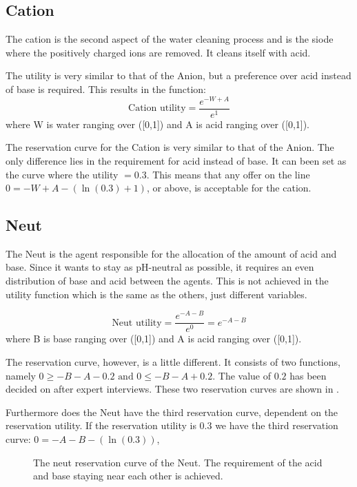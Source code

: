 \subsection{Cation}
The cation is the second aspect of the water cleaning process and is the siode where the positively charged ions are removed. It cleans itself with acid. %

The utility is very similar to that of the Anion, but a preference over acid instead of base is required. This results in the function:
\[
\text{Cation utility} = \frac{e^{-W+A}}{e^1}
\] 
where W is water ranging over ([0,1]) and A is acid ranging over ([0,1]).

The reservation curve for the Cation is very similar to that of the Anion. The only difference lies in the requirement for acid instead of base. It can been set as the curve where the utility $= 0.3$. This means that any offer on the line $0 = - W +A - (\ln(0.3)+1)$, or above, is acceptable for the cation.

\subsection{Neut}
The Neut is the agent responsible for the allocation of the amount of acid and base. Since it wants to stay as pH-neutral as possible, it requires an even distribution of base and acid between the agents. This is not achieved in the utility function which is the same as the others, just different variables.

\[
\text{Neut utility} = \frac{e^{-A-B}}{e^0} = e^{-A-B}
\] 
where B is base ranging over ([0,1]) and A is acid ranging over ([0,1]).

The reservation curve, however, is a little different. It consists of two functions, namely $0 \geq -B - A - 0.2 \text{ and }  0 \leq -B - A + 0.2$. The value of $0.2$ has been decided on after expert interviews. These two reservation curves are shown in .

Furthermore does the Neut have the third reservation curve, dependent on the reservation utility. If the reservation utility is $0.3$ we have the third reservation curve: $0 = - A - B - (\ln(0.3))$,

\begin{figure}[h]
		\centering
			\caption{The neut reservation curve of the Neut. The requirement of the acid and base staying near each other is achieved.}
			\label{fig:neutreservationcurve}
	\end{figure}
\clearpage
